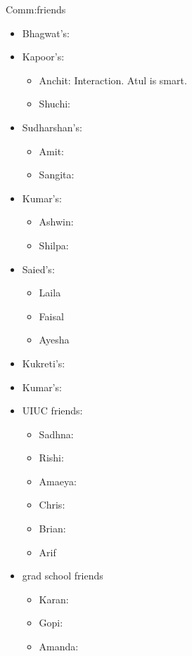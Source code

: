 \documentclass[serif, mathserif, final]{beamer}
\begin{document}
\begin{frame}
\begin{columns}
\begin{column}{0.25\linewidth}
\begin{block}{Comm:friends}
\begin{itemize}
\item Bhagwat’s: 

\item Kapoor’s: 
\begin{itemize}
\item \tiny Anchit: 
Interaction. Atul is smart. 
\item \tiny Shuchi: 
\end{itemize}

\item Sudharshan’s: 
\begin{itemize} 
\tiny \item \tiny Amit:  
\item \tiny Sangita:  
\end{itemize} 

\item Kumar’s:
\begin{itemize}
\tiny \item \tiny Ashwin: 
\item \tiny Shilpa: 
\end{itemize} 

\item Saied’s: 
\begin{itemize}
\tiny \item \tiny Laila 
\item \tiny Faisal 
\item \tiny Ayesha
\end{itemize} 

\item Kukreti’s:

\item Kumar’s:
\item UIUC friends: 
\begin{itemize} 
\tiny \item \tiny Sadhna: 
\item \tiny Rishi: 
\item \tiny Amaeya: 
\item \tiny Chris: 
\item \tiny Brian: 
\item \tiny Arif 
\end{itemize} 
\item grad school friends 
\begin{itemize} 
\tiny \item \tiny  Karan: 
\item \tiny Gopi: 
\item \tiny Amanda:  
\end{itemize}


\end{itemize}
\end{block}
\end{column}
\end{columns}
\end{frame}
\end{document}
